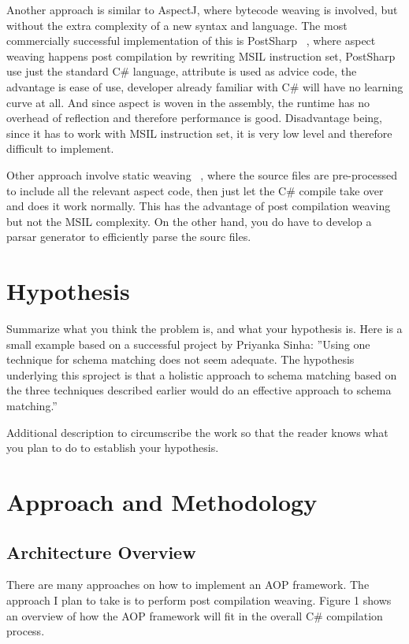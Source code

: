 Another approach is similar to AspectJ, where bytecode weaving is involved, but without the extra complexity of a new syntax and language. The most commercially successful implementation of this is PostSharp ~\cite{postsharp}, where aspect weaving happens post compilation by rewriting MSIL instruction set, PostSharp use just the standard C\# language, attribute is used as advice code, the advantage is ease of use, developer already familiar with C\# will have no learning curve at all. And since aspect is woven in the assembly, the runtime has no overhead of reflection and therefore performance is good. Disadvantage being, since it has to work with MSIL instruction set, it is very low level and therefore difficult to implement.

Other approach involve static weaving ~\cite{aspectcs}, where the source files are pre-processed to include all the relevant aspect code, then just let the C\# compile take over and does it work normally. This has the advantage of post compilation weaving but not the MSIL complexity. On the other hand, you do have to develop a parsar generator to efficiently parse the sourc files.

\section{Hypothesis}
Summarize what you think the problem is, and what your hypothesis
is. Here is a small example based on a successful project by Priyanka
Sinha: ''Using one technique for schema matching does not seem
adequate. The hypothesis underlying this sproject is that a holistic
approach to schema matching based on the three techniques described
earlier would do an effective approach to schema matching.''

Additional description to circumscribe the work so that the reader
knows what you plan to do to establish your hypothesis.

\section{Approach and Methodology}
\subsection{Architecture Overview}
There are many approaches on how to implement an AOP framework. The approach I plan to take is to perform post compilation weaving. Figure 1 shows an overview of how the AOP framework will fit in the overall C\# compilation process.

